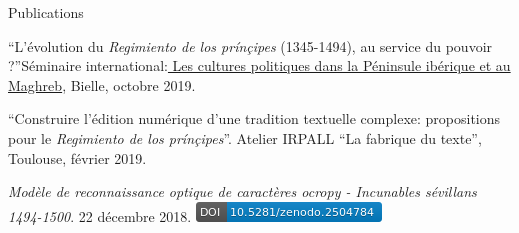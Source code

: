 











\begin{rubric}{Publications}
                    
                
                    
                    \entry*
                \enquote{L'évolution du \textit{Regimiento de los prínçipes}
                    (1345-1494), au service du pouvoir ?}Séminaire international:\href{https://recherche.univ-pau.fr/fr/accueil/cpim.html}{ Les cultures
                    politiques dans la Péninsule ibérique et au Maghreb}, Bielle,
                    octobre 2019. 
                    
                    \entry*
                \enquote{Construire l'édition numérique d'une tradition textuelle complexe:
                    propositions pour le \textit{Regimiento de los prínçipes}}. Atelier
                    IRPALL \enquote{La fabrique du texte}, Toulouse, février
                    2019.
            
                    
                    \entry*
                \textit{Modèle de reconnaissance optique de caractères ocropy
                    - Incunables sévillans
                    1494-1500}.
                    22 décembre 2018. \href{https://doi.org/10.5281/zenodo.2504783}{\includegraphics[scale=0.55]{../img/zenodo2504784.png}} \end{rubric}


